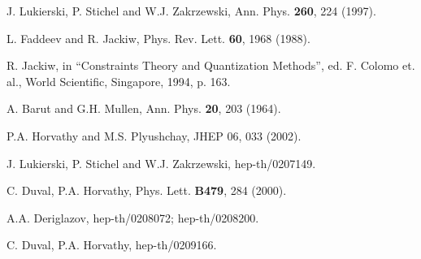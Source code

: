 \documentclass[a4paper,12pt]{article}
\begin{document}
\begin{thebibliography}{99}

 J. Lukierski, P. Stichel and W.J. Zakrzewski,
 Ann. Phys.  {\bf  260},     224 (1997).

  L. Faddeev and R. Jackiw, Phys. Rev. Lett.   {\bf  60}, 
  1968 (1988).

   R. Jackiw, in ``Constraints Theory and
  Quantization Methods'', ed. F. Colomo et. al., World Scientific,
   Singapore, 1994, p. 163.

    A. Barut and G.H. Mullen, Ann. Phys.  {\bf   20},
    203 (1964).

     P.A. Horvathy and M.S. Plyushchay, JHEP 06, 033 
(2002).

 J. Lukierski, P. Stichel and W.J. Zakrzewski,
 hep-th/0207149.

  C. Duval, P.A. Horvathy, Phys. Lett.  {\bf  B479}, 
  284 (2000).

   A.A. Deriglazov, hep-th/0208072; hep-th/0208200.

   C. Duval, P.A. Horvathy, hep-th/0209166.

\end{thebibliography}
\end{document}
